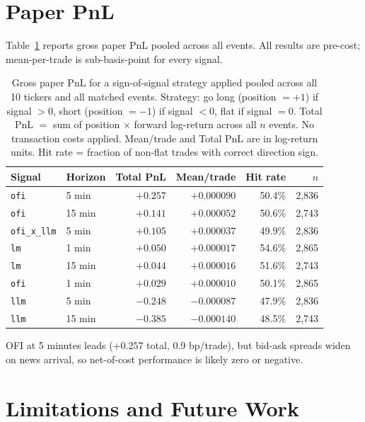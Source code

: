 \documentclass[11pt, letterpaper]{article}
\begin{document}
\section{Paper PnL}
\label{sec:pnl}

Table~\ref{tab:pnl} reports gross paper PnL pooled across all events.
All results are pre-cost; mean-per-trade is sub-basis-point for every signal.

\begin{table}[h]
\centering
\small
\caption{Gross paper PnL for a sign-of-signal strategy applied pooled across all 10
tickers and all matched events. Strategy: go long (position $= +1$) if signal $> 0$,
short (position $= -1$) if signal $< 0$, flat if signal $= 0$. Total PnL $=$ sum
of position $\times$ forward log-return across all $n$ events. No transaction costs
applied. Mean/trade and Total PnL are in log-return units. Hit rate = fraction of
non-flat trades with correct direction sign.}
\label{tab:pnl}
\begin{tabular}{llrrrr}
\toprule
Signal & Horizon & Total PnL & Mean/trade & Hit rate & $n$ \\
\midrule
\texttt{ofi}         & 5 min  & $+0.257$ & $+0.000090$ & 50.4\% & 2,836 \\
\texttt{ofi}         & 15 min & $+0.141$ & $+0.000052$ & 50.6\% & 2,743 \\
\texttt{ofi\_x\_llm} & 5 min  & $+0.105$ & $+0.000037$ & 49.9\% & 2,836 \\
\texttt{lm}          & 1 min  & $+0.050$ & $+0.000017$ & 54.6\% & 2,865 \\
\texttt{lm}          & 15 min & $+0.044$ & $+0.000016$ & 51.6\% & 2,743 \\
\texttt{ofi}         & 1 min  & $+0.029$ & $+0.000010$ & 50.1\% & 2,865 \\
\midrule
\texttt{llm}         & 5 min  & $-0.248$ & $-0.000087$ & 47.9\% & 2,836 \\
\texttt{llm}         & 15 min & $-0.385$ & $-0.000140$ & 48.5\% & 2,743 \\
\bottomrule
\end{tabular}
\end{table}

OFI at 5 minutes leads ($+0.257$ total, 0.9 bp/trade), but bid-ask spreads widen
on news arrival, so net-of-cost performance is likely zero or negative.

\section{Limitations and Future Work}
\label{sec:limits}
\end{document}
